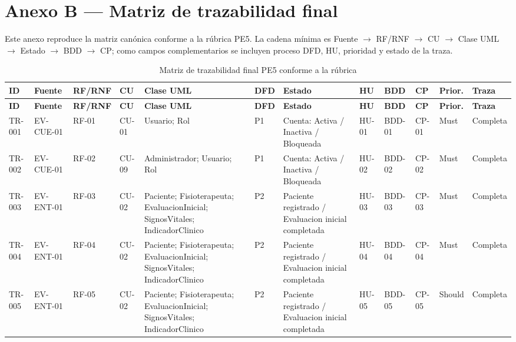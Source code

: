 \documentclass[12pt,a4paper]{article}
\begin{document}
\section*{Anexo B — Matriz de trazabilidad final}
Este anexo reproduce la matriz canónica conforme a la rúbrica PE5. La cadena mínima es Fuente $\rightarrow$ RF/RNF $\rightarrow$ CU $\rightarrow$ Clase UML $\rightarrow$ Estado $\rightarrow$ BDD $\rightarrow$ CP; como campos complementarios se incluyen proceso DFD, HU, prioridad y estado de la traza.

\begin{landscape}
\setlength{\tabcolsep}{2pt}\fontsize{6.2}{7.2}\selectfont
\begin{longtable}{p{0.9cm}p{2.5cm}p{1.7cm}p{1.8cm}p{3.6cm}p{1.6cm}p{3.0cm}p{1.6cm}p{1.8cm}p{1.8cm}p{1.4cm}p{1.5cm}}
\caption{Matriz de trazabilidad final PE5 conforme a la rúbrica}\\\toprule
\textbf{ID}&\textbf{Fuente}&\textbf{RF/RNF}&\textbf{CU}&\textbf{Clase UML}&\textbf{DFD}&\textbf{Estado}&\textbf{HU}&\textbf{BDD}&\textbf{CP}&\textbf{Prior.}&\textbf{Traza}\\\midrule\endfirsthead
\toprule\textbf{ID}&\textbf{Fuente}&\textbf{RF/RNF}&\textbf{CU}&\textbf{Clase UML}&\textbf{DFD}&\textbf{Estado}&\textbf{HU}&\textbf{BDD}&\textbf{CP}&\textbf{Prior.}&\textbf{Traza}\\\midrule\endhead
TR-001 & EV-CUE-01 & RF-01 & CU-01 & Usuario; Rol & P1 & Cuenta: Activa / Inactiva / Bloqueada & HU-01 & BDD-01 & CP-01 & Must & Completa \\
TR-002 & EV-CUE-01 & RF-02 & CU-09 & Administrador; Usuario; Rol & P1 & Cuenta: Activa / Inactiva / Bloqueada & HU-02 & BDD-02 & CP-02 & Must & Completa \\
TR-003 & EV-ENT-01 & RF-03 & CU-02 & Paciente; Fisioterapeuta; EvaluacionInicial; SignosVitales; IndicadorClinico & P2 & Paciente registrado / Evaluacion inicial completada & HU-03 & BDD-03 & CP-03 & Must & Completa \\
TR-004 & EV-ENT-01 & RF-04 & CU-02 & Paciente; Fisioterapeuta; EvaluacionInicial; SignosVitales; IndicadorClinico & P2 & Paciente registrado / Evaluacion inicial completada & HU-04 & BDD-04 & CP-04 & Must & Completa \\
TR-005 & EV-ENT-01 & RF-05 & CU-02 & Paciente; Fisioterapeuta; EvaluacionInicial; SignosVitales; IndicadorClinico & P2 & Paciente registrado / Evaluacion inicial completada & HU-05 & BDD-05 & CP-05 & Should & Completa \\

\end{longtable}
\end{landscape}
\end{document}
